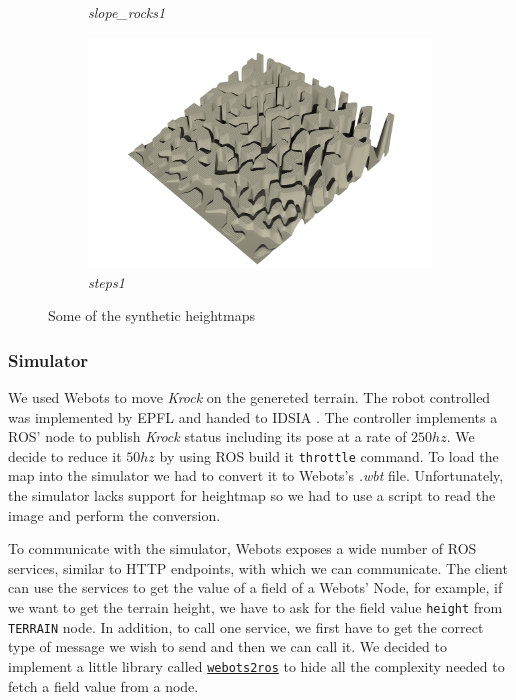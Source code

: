 \documentclass[../document.tex]{subfiles}
\begin{document}
\begin{figure}[H]
\begin{subfigure}[b]{0.45\textwidth}
            \caption{\emph{slope\_rocks1}}
        \end{subfigure}    
        \begin{subfigure}[b]{0.45\textwidth}
            \includegraphics[width=\textwidth]{../img/rendered/4.png}
            \caption{\emph{steps1}}
        \end{subfigure}    
    \label{fig: heightmaps}
    \caption{Some of the synthetic heightmaps}
\end{figure}
\subsubsection{Simulator}
We used Webots to move \emph{Krock} on the genereted terrain. The robot controlled was implemented by EPFL  and handed to IDSIA . The controller implements a ROS' node to publish \emph{Krock} status including its pose at a rate of $250hz$. We decide to reduce it $50hz$ by using ROS build it \texttt{throttle} command. 
To load the map into the simulator we had to convert it to Webots's \emph{.wbt} file. Unfortunately, the simulator lacks support for heightmap so we had to use a script to read the image and perform the conversion.

To communicate with the simulator, Webots exposes a wide number of ROS services, similar to HTTP endpoints, with which we can communicate. The client can use the services to get the value of a field of a Webots' Node, for example, if we want to get the terrain height, we have to ask for the field value \texttt{height} from \texttt{TERRAIN} node. In addition, to call one service, we first have to get the correct type of message we wish to send and then we can call it. We decided to implement a little library called \href{https://github.com/FrancescoSaverioZuppichini/Master-Thesis/tree/master/core/utilities/webots2ros}{\texttt{webots2ros}} to hide all the complexity needed to fetch a field value from a node.
\end{document}
